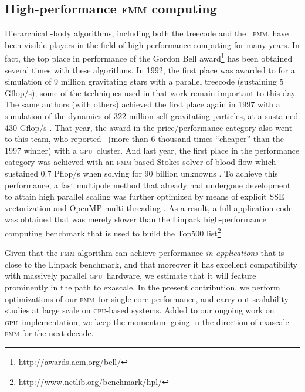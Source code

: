 \documentclass[10pt,twocolumn]{article}
\newcommand{\bigON}{\xspace}
\newcommand{\fmm}{\textsc{fmm}\xspace}
\newcommand{\cpu}{\textsc{cpu}}
\newcommand{\gpu}{\textsc{gpu}}
\begin{document}
\subsection{High-performance \fmm computing}

Hierarchical -body algorithms, including both the  treecode and the \bigON\ \fmm, have been visible players in the field of high-performance computing for many years. In fact, the top place in performance of the Gordon Bell award\footnote{\href{http://awards.acm.org/bell/}{http://awards.acm.org/bell/}} has been obtained several times with these algorithms. In 1992, the first place was awarded to \cite{WarrenSalmon1992} for a simulation of 9 million gravitating stars with a parallel treecode (sustaining 5 Gflop/s); some of the techniques used in that work remain important to this day. The same authors (with others) achieved the first place again in 1997 with a simulation of the dynamics of 322 million self-gravitating particles, at a sustained 430 Gflop/s \cite[]{WarrenSalmonETal1997}. That year, the award in the price/performance category also went to this team, who reported \ (more than 6 thousand times ``cheaper'' than the 1997 winner) with a \gpu\ cluster. And last year, the first place in the performance category was achieved with an \fmm-based Stokes solver of blood flow which sustained 0.7 Pflop/s when solving for 90 billion unknowns \cite[]{RahimianETal2010}. To achieve this performance, a fast multipole method that already had undergone development to attain high parallel scaling \cite[]{LashukETal2009} was further optimized by means of explicit SSE vectorization and OpenMP multi-threading \cite[]{ChandramowlishwaranETal2010}. As a result, a full application code was obtained that was merely  slower than the Linpack high-performance computing benchmark that is used to build the Top500 list\footnote{\href{http://www.netlib.org/benchmark/hpl/}{http://www.netlib.org/benchmark/hpl/}}.


\medskip

Given that the \fmm algorithm can achieve performance \emph{in applications} that is close to the Linpack benchmark, and that moreover it has excellent compatibility with massively parallel \gpu\ hardware, we estimate that it will feature prominently in the path to exascale. In the present contribution, we perform optimizations of our \fmm\ for single-core performance, and carry out scalability studies at large scale on \cpu-based systems. Added to our ongoing work on \gpu\ implementation, we keep the momentum going in the direction of exascale \fmm for the next decade.
\end{document}

